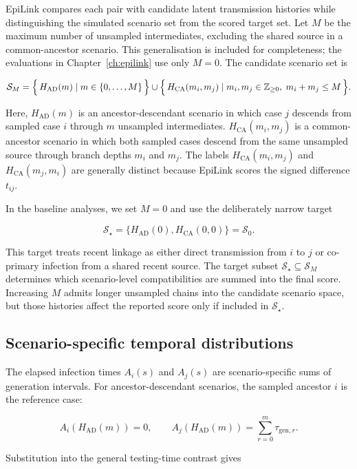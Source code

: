 EpiLink compares each pair with candidate latent transmission histories while distinguishing the simulated scenario set from the scored target set. Let $M$ be the maximum number of unsampled intermediates, excluding the shared source in a common-ancestor scenario. This generalisation is included for completeness; the evaluations in Chapter~\ref{ch:epilink} use only $M=0$. The candidate scenario set is

\[
	\mathcal{S}_M =
	\Bigl\{\, H_{\mathrm{AD}}(m) \mid m \in \{0,\dots,M\} \,\Bigr\}
	\cup
	\Bigl\{\, H_{\mathrm{CA}}(m_i,m_j) \mid m_i,m_j \in \mathbb{Z}_{\ge 0},\;
	m_i+m_j \le M \,\Bigr\}.
\]

Here, $H_{\mathrm{AD}}(m)$ is an ancestor-descendant scenario in which case $j$ descends from sampled case $i$ through $m$ unsampled intermediates. $H_{\mathrm{CA}}(m_i,m_j)$ is a common-ancestor scenario in which both sampled cases descend from the same unsampled source through branch depths $m_i$ and $m_j$. The labels $H_{\mathrm{CA}}(m_i,m_j)$ and $H_{\mathrm{CA}}(m_j,m_i)$ are generally distinct because EpiLink scores the signed difference $t_{ij}$.

In the baseline analyses, we set $M=0$ and use the deliberately narrow target

\[
	\mathcal{S}_\star =
	\{H_{\mathrm{AD}}(0), H_{\mathrm{CA}}(0,0)\}
	= \mathcal{S}_0.
\]

This target treats recent linkage as either direct transmission from $i$ to $j$ or co-primary infection from a shared recent source. The target subset $\mathcal{S}_\star\subseteq\mathcal{S}_M$ determines which scenario-level compatibilities are summed into the final score. Increasing $M$ admits longer unsampled chains into the candidate scenario space, but those histories affect the reported score only if included in $\mathcal{S}_\star$.

\subsection{Scenario-specific temporal distributions}\label{sec:app_ch3_scenario_temporal_distributions}

The elapsed infection times $A_i(s)$ and $A_j(s)$ are scenario-specific sums of generation intervals. For ancestor-descendant scenarios, the sampled ancestor $i$ is the reference case:

\[
	A_i(H_{\mathrm{AD}}(m)) = 0,
	\qquad
	A_j(H_{\mathrm{AD}}(m)) =
	\sum_{r=0}^{m}\tau_{\mathrm{gen},r}.
\]

Substitution into the general testing-time contrast gives

